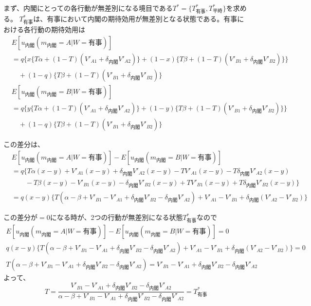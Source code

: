 \documentclass[main.tex]{subfiles}
\begin{document}
まず、内閣にとっての各行動が無差別になる境目である$T^* = \lbrace T^*_{有事}, T^*_{平時} \rbrace$を求める。
$T^*_{有事}$は、有事において内閣の期待効用が無差別となる状態である。有事における各行動の期待効用は
\begin{align*}
    & E[u_{内閣}(m_{内閣}=A|W=有事)]\\
    & = q\Big\lbrace 
        x \lbrace T\alpha + (1-T)(V'_{A1} + \delta_{内閣} V'_{A2}) \rbrace + (1-x)\lbrace T\beta + (1-T)(V'_{B1} + \delta_{内閣} V'_{B2}) \rbrace 
        \Big\rbrace\\
    & \quad +(1-q)\lbrace T\beta + (1-T)(V'_{B1} + \delta_{内閣} V'_{B2}) \rbrace
\end{align*}
\begin{align*}
    & E[u_{内閣}(m_{内閣}=B|W=有事)]\\
    & = q\Big\lbrace
        y \lbrace T\alpha + (1-T)(V'_{A1} + \delta_{内閣} V'_{A2}) \rbrace + (1-y)\lbrace T\beta + (1-T)(V'_{B1} + \delta_{内閣} V'_{B2}) \rbrace 
        \Big\rbrace\\
    & \quad +(1-q)\lbrace T\beta + (1-T)(V'_{B1} + \delta_{内閣} V'_{B2}) \rbrace
\end{align*}

\noindent
この差分は、
\begin{align*}
    & E[u_{内閣}(m_{内閣}=A|W=有事)] - E[u_{内閣}(m_{内閣}=B|W=有事)]\\
    & = q\Big\lbrace
        T\alpha(x-y) + V'_{A1}(x-y) + \delta_{内閣}V'_{A2}(x-y) - TV'_{A1}(x-y) - T\delta_{内閣}V'_{A2}(x-y) \\
    &   \quad\quad -T\beta(x-y) - V'_{B1}(x-y) - \delta_{内閣}V'_{B2}(x-y) + TV'_{B1}(x-y) + T\delta_{内閣}V'_{B2}(x-y)
        \Big\rbrace\\
    & = q(x-y) \lbrace T(\alpha-\beta + V'_{B1}-V'_{A1} + \delta_{内閣}V'_{B2} - \delta_{内閣}V'_{A2}) 
                +V'_{A1} - V'_{B1} + \delta_{内閣}(V'_{A2} - V'_{B2}) \rbrace
\end{align*}

\noindent
この差分が$=0$になる時が、2つの行動が無差別になる状態$T^*_{有事}$なので
\begin{gather*}
    E[u_{内閣}(m_{内閣}=A|W=有事)] - E[u_{内閣}(m_{内閣}=B|W=有事)] = 0　\\
    q(x-y) \lbrace T(\alpha-\beta + V'_{B1}-V'_{A1} + \delta_{内閣}V'_{B2} - \delta_{内閣}V'_{A2}) 
                +V'_{A1} - V'_{B1} + \delta_{内閣}(V'_{A2} - V'_{B2})  \rbrace = 0 \\
    T(\alpha-\beta + V'_{B1}-V'_{A1} + \delta_{内閣}V'_{B2} - \delta_{内閣}V'_{A2}) 
    = V'_{B1} - V'_{A1} +\delta_{内閣}V'_{B2} - \delta_{内閣}V'_{A2}
\end{gather*}
よって、
$$T = \frac{ V'_{B1} - V'_{A1} +\delta_{内閣}V'_{B2} - \delta_{内閣}V'_{A2} }{ \alpha-\beta + V'_{B1}-V'_{A1} + \delta_{内閣}V'_{B2} - \delta_{内閣}V'_{A2} }
= T^*_{有事}$$
\end{document}
